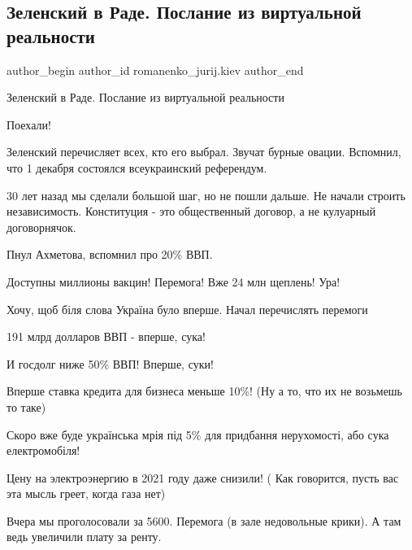  
 
 
 
 
 
\subsection{Зеленский в Раде. Послание из виртуальной реальности}
\label{sec:01_12_2021.fb.romanenko_jurij.kiev.1.zelenskii_virtual_reality}
 
\ifcmt
 author_begin
   author_id romanenko_jurij.kiev
 author_end
\fi

Зеленский в Раде. Послание из виртуальной реальности

Поехали!

Зеленский перечисляет всех, кто его выбрал. Звучат бурные овации.  Вспомнил,
что 1 декабря состоялся всеукраинский референдум. 

30 лет назад мы сделали большой шаг, но не пошли дальше.  Не начали строить
независимость. Конституция - это общественный договор, а не кулуарный
договорнячок. 

Пнул Ахметова, вспомнил про 20\% ВВП.

Доступны миллионы вакцин! Перемога! Вже 24 млн щеплень! Ура!

Хочу, щоб біля слова Україна було вперше. Начал перечислять перемоги

191 млрд долларов ВВП - вперше, сука! 

И госдолг ниже 50\% ВВП! Вперше, суки! 

Вперше ставка кредита для бизнеса меньше 10\%! (Ну а то, что их не возьмешь то
таке)

Скоро вже буде українська мрія під 5\% для придбання нерухомості, або сука
електромобіля!

Цену на электроэнергию в 2021 году даже снизили! ( Как говорится, пусть вас эта
мысль греет, когда газа нет) 

Вчера мы проголосовали за 5600. Перемога (в зале недовольные крики). А там ведь
увеличили плату за ренту. 

